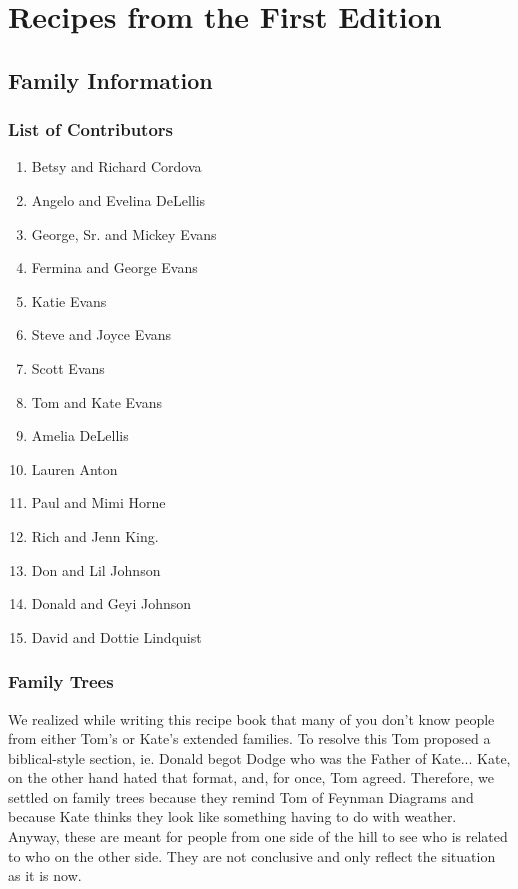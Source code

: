 \documentclass[12pt]{book}
\begin{document}
\part{Recipes from the First Edition}






\appendix
\chapter{Family Information}

\section{List of Contributors}

\begin{enumerate}
 \color{red}
 \itemsep0pt
 \parskip1pt
\item Betsy and Richard Cordova %
\item Angelo and Evelina DeLellis
\item George, Sr. and Mickey Evans
\item Fermina and George Evans %
\item Katie Evans
\item Steve and Joyce Evans
\item Scott Evans
\item Tom and Kate Evans %
\item Amelia DeLellis
\item Lauren Anton
\item Paul and Mimi Horne %
\item Rich and Jenn King.
\item Don and Lil Johnson
\item Donald and Geyi Johnson
\item David and Dottie Lindquist
\end{enumerate}

\section{Family Trees}

{\color{red}
We realized while writing this recipe book that many of you don't know people from either Tom's or Kate's extended families.  To resolve this Tom proposed a biblical-style section, ie. Donald begot Dodge who was the Father of Kate...  Kate, on the other hand hated that format, and, for once, Tom agreed.  Therefore, we settled on family trees because they remind Tom of Feynman Diagrams and because Kate thinks they look like something having to do with weather.  Anyway, these are meant for people from one side of the hill to see who is related to who on the other side.
They are not conclusive and only reflect the situation as it is now.
}
\end{document}
